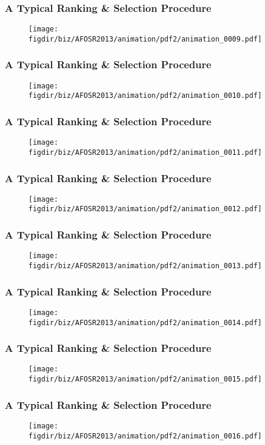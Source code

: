 \documentclass[13pt]{beamer}
\newcommand{\figdir}{../../fig}
\begin{document}
\begin{frame}\frametitle{A Typical Ranking \& Selection Procedure}\begin{figure}\texttt{[image: \\figdir/biz/AFOSR2013/animation/pdf2/animation\_0009.pdf]}\end{figure}\end{frame}
\begin{frame}\frametitle{A Typical Ranking \& Selection Procedure}\begin{figure}\texttt{[image: \\figdir/biz/AFOSR2013/animation/pdf2/animation\_0010.pdf]}\end{figure}\end{frame}
\begin{frame}\frametitle{A Typical Ranking \& Selection Procedure}\begin{figure}\texttt{[image: \\figdir/biz/AFOSR2013/animation/pdf2/animation\_0011.pdf]}\end{figure}\end{frame}
\begin{frame}\frametitle{A Typical Ranking \& Selection Procedure}\begin{figure}\texttt{[image: \\figdir/biz/AFOSR2013/animation/pdf2/animation\_0012.pdf]}\end{figure}\end{frame}
\begin{frame}\frametitle{A Typical Ranking \& Selection Procedure}\begin{figure}\texttt{[image: \\figdir/biz/AFOSR2013/animation/pdf2/animation\_0013.pdf]}\end{figure}\end{frame}
\begin{frame}\frametitle{A Typical Ranking \& Selection Procedure}\begin{figure}\texttt{[image: \\figdir/biz/AFOSR2013/animation/pdf2/animation\_0014.pdf]}\end{figure}\end{frame}
\begin{frame}\frametitle{A Typical Ranking \& Selection Procedure}\begin{figure}\texttt{[image: \\figdir/biz/AFOSR2013/animation/pdf2/animation\_0015.pdf]}\end{figure}\end{frame}
\begin{frame}\frametitle{A Typical Ranking \& Selection Procedure}\begin{figure}\texttt{[image: \\figdir/biz/AFOSR2013/animation/pdf2/animation\_0016.pdf]}\end{figure}\end{frame}
\end{document}
